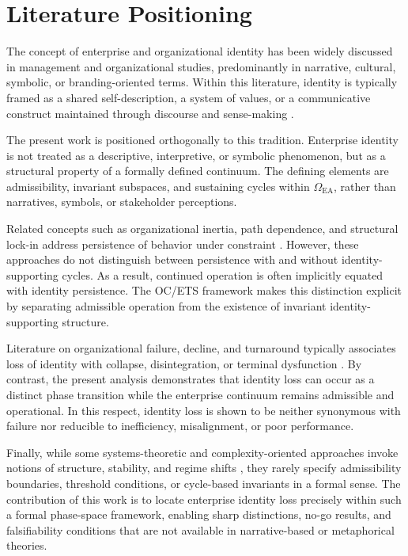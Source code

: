 ﻿\section{Literature Positioning}

The concept of enterprise and organizational identity has been widely discussed
in management and organizational studies, predominantly in narrative, cultural,
symbolic, or branding-oriented terms. Within this literature, identity is
typically framed as a shared self-description, a system of values, or a
communicative construct maintained through discourse and sense-making
\cite{albert1985organizational,gioia2000identity,ravasi2016organizational}.

The present work is positioned orthogonally to this tradition. Enterprise
identity is not treated as a descriptive, interpretive, or symbolic phenomenon,
but as a structural property of a formally defined continuum. The defining
elements are admissibility, invariant subspaces, and sustaining cycles within
$\Omega_{\mathrm{EA}}$, rather than narratives, symbols, or stakeholder
perceptions.

Related concepts such as organizational inertia, path dependence, and structural
lock-in address persistence of behavior under constraint
\cite{arthur1989competing,hedberg1981strategy}. However, these approaches do not
distinguish between persistence with and without identity-supporting cycles. As a
result, continued operation is often implicitly equated with identity
persistence. The OC/ETS framework makes this distinction explicit by separating
admissible operation from the existence of invariant identity-supporting
structure.

Literature on organizational failure, decline, and turnaround typically
associates loss of identity with collapse, disintegration, or terminal
dysfunction \cite{weitzel1989decline,hambrick1983some}. By contrast, the present
analysis demonstrates that identity loss can occur as a distinct phase transition
while the enterprise continuum remains admissible and operational. In this
respect, identity loss is shown to be neither synonymous with failure nor
reducible to inefficiency, misalignment, or poor performance.

Finally, while some systems-theoretic and complexity-oriented approaches invoke
notions of structure, stability, and regime shifts
\cite{holland1992complex,scheffer2009critical}, they rarely specify admissibility
boundaries, threshold conditions, or cycle-based invariants in a formal sense.
The contribution of this work is to locate enterprise identity loss precisely
within such a formal phase-space framework, enabling sharp distinctions, no-go
results, and falsifiability conditions that are not available in narrative-based
or metaphorical theories.
